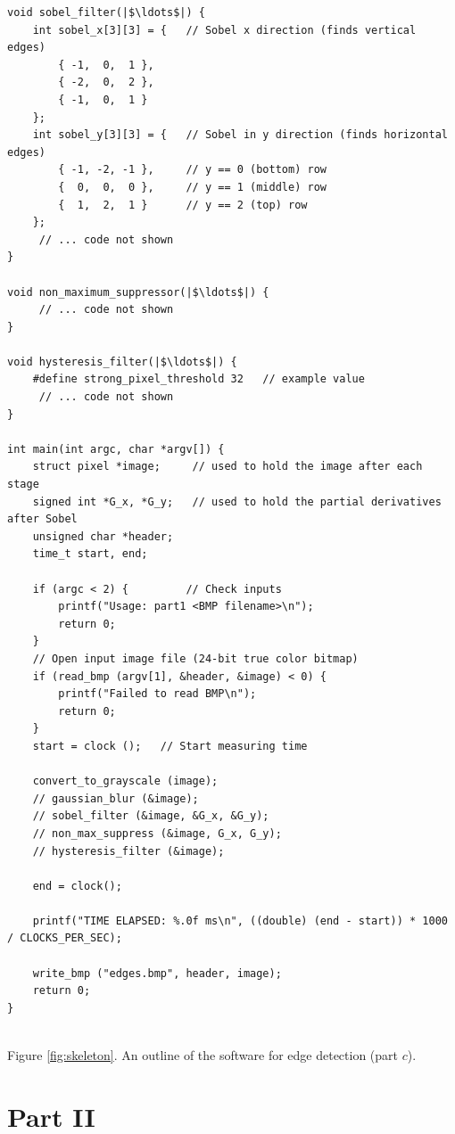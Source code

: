 \documentclass[epsfig,10pt,fullpage]{article}
\begin{document}
\lstset{language=C,numbers=none,escapechar=|}
\begin{center}
\begin{minipage}[t]{15.5 cm}
\begin{lstlisting}[name=skeleton]
void sobel_filter(|$\ldots$|) {
    int sobel_x[3][3] = {   // Sobel x direction (finds vertical edges)
        { -1,  0,  1 },
        { -2,  0,  2 },
        { -1,  0,  1 }
    };
    int sobel_y[3][3] = {   // Sobel in y direction (finds horizontal edges)
        { -1, -2, -1 },     // y == 0 (bottom) row
        {  0,  0,  0 },     // y == 1 (middle) row
        {  1,  2,  1 }      // y == 2 (top) row
    };
	 // ... code not shown
}

void non_maximum_suppressor(|$\ldots$|) {
	 // ... code not shown
}

void hysteresis_filter(|$\ldots$|) {
    #define strong_pixel_threshold 32	// example value
	 // ... code not shown
}

int main(int argc, char *argv[]) {
    struct pixel *image;     // used to hold the image after each stage
    signed int *G_x, *G_y;   // used to hold the partial derivatives after Sobel
    unsigned char *header;
    time_t start, end;
    
    if (argc < 2) {         // Check inputs
        printf("Usage: part1 <BMP filename>\n");
        return 0;
    }
    // Open input image file (24-bit true color bitmap)
    if (read_bmp (argv[1], &header, &image) < 0) {
        printf("Failed to read BMP\n");
        return 0;
    }
    start = clock ();   // Start measuring time
    
    convert_to_grayscale (image);
    // gaussian_blur (&image);
    // sobel_filter (&image, &G_x, &G_y);
    // non_max_suppress (&image, G_x, G_y);
    // hysteresis_filter (&image);
    
    end = clock();
    
    printf("TIME ELAPSED: %.0f ms\n", ((double) (end - start)) * 1000 / CLOCKS_PER_SEC);
    
    write_bmp ("edges.bmp", header, image);
    return 0;
}
\end{lstlisting}
~\\
Figure \ref{fig:skeleton}. An outline of the software for edge detection (part $c$).
\end{minipage}
\end{center}

\section*{Part II}
\end{document}
